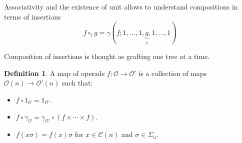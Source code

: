 \documentclass{beamer}
\theoremstyle{definition}
\newtheorem{defi}{Definition}
\newcommand{\CC}{\mathcal{C}}
\begin{document}
\begin{frame}
	Associativity and the existence of unit allows to understand compositions in terms of insertions $$f\circ_i g=\gamma(f;1,\dots, 1,\underbrace{g}_{i},1,\dots, 1)$$ \pause
	
	Composition of insertions is thought as grafting one tree at a time.
\end{frame}
\begin{frame}
	\begin{defi}
	 A map of operads $f:\mathcal{O}\to \mathcal{O}'$ is a collection of maps $\mathcal{O}(n)\to \mathcal{O}'(n)$ such that:
		\begin{itemize}
			\item<1->   $f\circ 1_\mathcal{O}=1_{\mathcal{O}'}$.
			\item<2->  $f\circ \gamma_\mathcal{O}=\gamma_{\mathcal{O}'}\circ (f\times\cdots\times f)$.
			\item<3->   $f(x\sigma)=f(x)\sigma$ for $x\in\CC(n)$ and $\sigma\in\Sigma_n$.
		\end{itemize}
	\end{defi}
	
	
\end{frame}
%	
\end{document}
